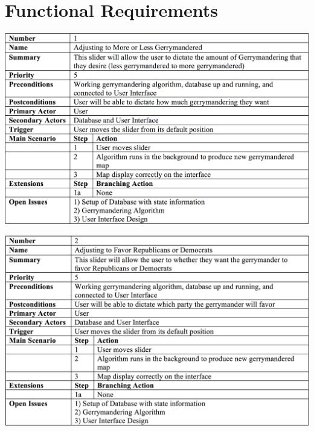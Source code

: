\documentclass{article}
\begin{document}
\vspace{2.5mm}


\section{Functional Requirements}\label{sec:functionalReq}

\vspace{2.5mm}

\begin{addmargin}[4em]{0em}


\begin{center}
\hspace*{-2cm}      
\includegraphics[scale=.25]{Slider1.png}
\end{center}

\begin{center}
\hspace*{-2cm}      
\includegraphics[scale=.25]{Slider2.png}
\end{center}


\end{addmargin}
\end{document}
